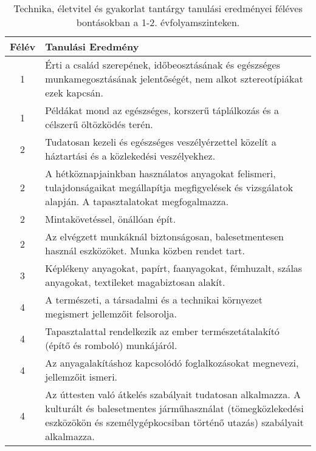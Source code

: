        
           \begin{longtable}{c | p{} }
            \caption[Technika, életvitel és gyakorlat 1-2.]{Technika, életvitel és gyakorlat tantárgy tanulási eredményei féléves bontásokban a 1-2. évfolyamszinteken. }  \\

            \textbf{Félév} & \textbf{Tanulási Eredmény} \\
            \hline
            \endhead
                                
                                          1 &  Érti a család szerepének, időbeosztásának és egészséges munkamegosztásának jelentőségét, nem alkot sztereotípiákat ezek kapcsán. \\ \hline
                                          1 &  Példákat mond az egészséges, korszerű táplálkozás és a célszerű öltözködés terén. \\ \hline
                                      
                                
                                          2 &  Tudatosan kezeli és egészséges veszélyérzettel közelít a háztartási és a közlekedési veszélyekhez. \\ \hline
                                          2 &  A hétköznapjainkban használatos anyagokat felismeri, tulajdonságaikat megállapítja megfigyelések és vizsgálatok alapján. A tapasztalatokat megfogalmazza. \\ \hline
                                          2 &  Mintakövetéssel, önállóan épít. \\ \hline
                                          2 &  Az elvégzett munkáknál biztonságosan, balesetmentesen használ eszközöket. Munka közben rendet tart. \\ \hline
                                      
                                
                                          3 &  Képlékeny anyagokat, papírt, faanyagokat, fémhuzalt, szálas anyagokat, textileket magabiztosan alakít. \\ \hline
                                      
                                
                                          4 &  A természeti, a társadalmi és a technikai környezet megismert jellemzőit felsorolja. \\ \hline
                                          4 &  Tapasztalattal rendelkezik az ember természetátalakító (építő és romboló) munkájáról. \\ \hline
                                          4 &  Az anyagalakításhoz kapcsolódó foglalkozásokat megnevezi, jellemzőit ismeri. \\ \hline
                                          4 &  Az úttesten való átkelés szabályait tudatosan alkalmazza. A kulturált és balesetmentes járműhasználat (tömegközlekedési eszközökön és személygépkocsiban történő utazás) szabályait alkalmazza. \\ \hline
                                      
                        \end{longtable}
            \clearpage

